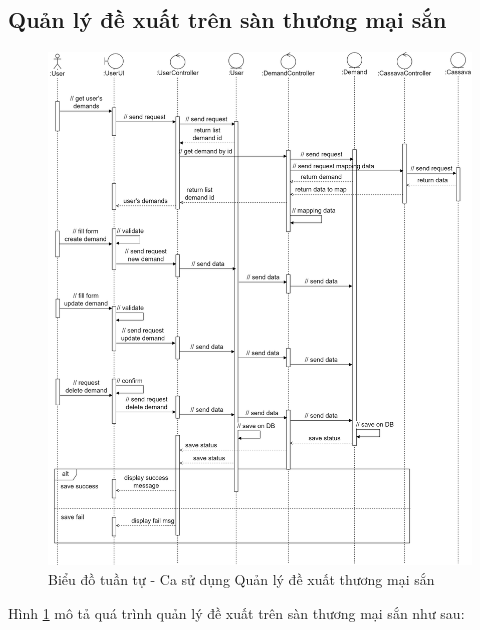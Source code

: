 \documentclass[./../main.tex]{subfiles}
\begin{document}
\subsection{Quản lý đề xuất trên sàn thương mại sắn}
\begin{figure}[H]
	\centering
	\includegraphics[width=\linewidth]{./img/uc14.png}
	\caption{\label{tab:seq-uc9}Biểu đồ tuần tự - Ca sử dụng Quản lý đề xuất thương mại sắn}
\end{figure}
Hình \ref{tab:seq-uc9} mô tả quá trình quản lý đề xuất trên sàn thương mại sắn như sau:
\end{document}
